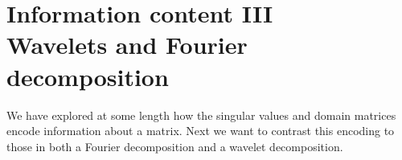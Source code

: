 \chapter{Information content III\\Wavelets and Fourier decomposition}

We have explored at some length how the singular values and domain matrices encode information about a matrix. Next we want to contrast this encoding to those in both a Fourier decomposition and a wavelet decomposition.

%




\endinput